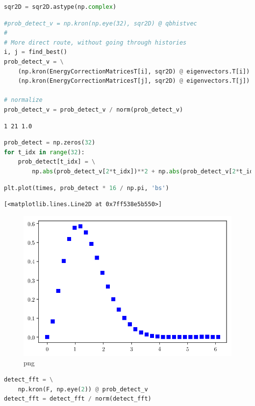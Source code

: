 \begin{lstlisting}[language=Python]
sqr2D = sqr2D.astype(np.complex)
\end{lstlisting}

\begin{lstlisting}[language=Python]
#prob_detect_v = np.kron(np.eye(32), sqr2D) @ qbhistvec
#
# More direct route, without going through histories
i, j = find_best()
prob_detect_v = \
    (np.kron(EnergyCorrectionMatricesT[i], sqr2D) @ eigenvectors.T[i]) + \
    (np.kron(EnergyCorrectionMatricesT[j], sqr2D) @ eigenvectors.T[j])

# normalize
prob_detect_v = prob_detect_v / norm(prob_detect_v)

\end{lstlisting}

\begin{lstlisting}
1 21 1.0
\end{lstlisting}

\begin{lstlisting}[language=Python]
prob_detect = np.zeros(32)
for t_idx in range(32):
    prob_detect[t_idx] = \
        np.abs(prob_detect_v[2*t_idx])**2 + np.abs(prob_detect_v[2*t_idx+1])**2
\end{lstlisting}

\begin{lstlisting}[language=Python]
plt.plot(times, prob_detect * 16 / np.pi, 'bs')
\end{lstlisting}

\begin{lstlisting}
[<matplotlib.lines.Line2D at 0x7ff538e5b550>]
\end{lstlisting}

\begin{figure}
\centering
\includegraphics[width=0.6\linewidth]{output_99_1.png}
\caption[]{png}
\end{figure}

\begin{lstlisting}[language=Python]
detect_fft = \
    np.kron(F, np.eye(2)) @ prob_detect_v
detect_fft = detect_fft / norm(detect_fft)
\end{lstlisting}


